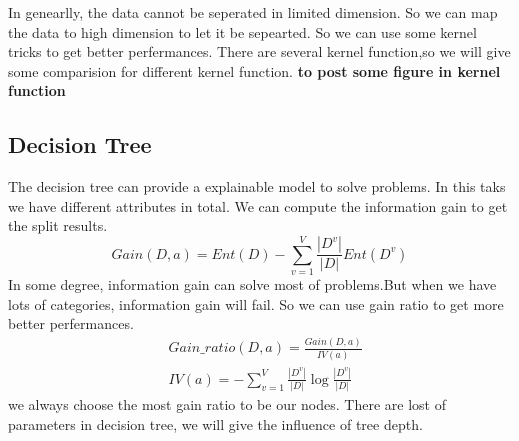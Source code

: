 In genearlly, the data cannot be seperated in limited dimension. So we can map the data to high dimension to let it be sepearted. So we can use some kernel tricks to get better perfermances. There are several kernel function,so we will give some comparision for different kernel function.
\textbf{to post some figure in kernel function}

\subsection{Decision Tree}
The decision tree can provide a explainable model to solve problems. In this taks we have different attributes in total. We can compute the information gain to get the split results.
\begin{equation}
    Gain(D, a) = Ent(D) - \sum_{v=1}^{V} \frac{|D^v|}{|D|} Ent(D^v)
\end{equation}
In some degree, information gain can solve most of problems.But when we have lots of categories, information gain will fail. So we can use gain ratio to get more better perfermances.
\begin{align}
    &Gain\_ratio(D, a) = \frac{Gain(D,a)}{IV(a)}\\
    &IV(a) = -\sum_{v=1}^{V} \frac{|D^v|}{|D|} \log\frac{|D^v|}{|D|}
\end{align}
we always choose the most gain ratio to be our nodes. There are lost of parameters in decision tree, we will give the influence of tree depth.

